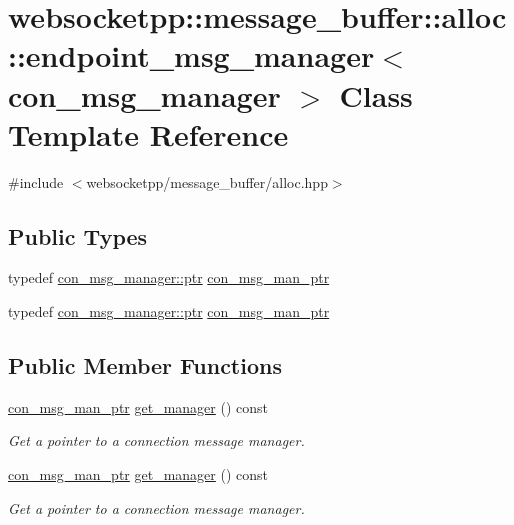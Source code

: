 \hypertarget{classwebsocketpp_1_1message__buffer_1_1alloc_1_1endpoint__msg__manager}{}\section{websocketpp\+:\+:message\+\_\+buffer\+:\+:alloc\+:\+:endpoint\+\_\+msg\+\_\+manager$<$ con\+\_\+msg\+\_\+manager $>$ Class Template Reference}
\label{classwebsocketpp_1_1message__buffer_1_1alloc_1_1endpoint__msg__manager}


{\ttfamily \#include $<$websocketpp/message\+\_\+buffer/alloc.\+hpp$>$}

\subsection*{Public Types}
\begin{DoxyCompactItemize}
\item 
typedef \hyperlink{classwebsocketpp_1_1message__buffer_1_1alloc_1_1con__msg__manager_ab4a21eb77cea439747f0b988e643e940}{con\+\_\+msg\+\_\+manager\+::ptr} \hyperlink{classwebsocketpp_1_1message__buffer_1_1alloc_1_1endpoint__msg__manager_aa850684cf613468b4c6bb1497dcb2f52}{con\+\_\+msg\+\_\+man\+\_\+ptr}
\item 
typedef \hyperlink{classwebsocketpp_1_1message__buffer_1_1alloc_1_1con__msg__manager_ab4a21eb77cea439747f0b988e643e940}{con\+\_\+msg\+\_\+manager\+::ptr} \hyperlink{classwebsocketpp_1_1message__buffer_1_1alloc_1_1endpoint__msg__manager_aa850684cf613468b4c6bb1497dcb2f52}{con\+\_\+msg\+\_\+man\+\_\+ptr}
\end{DoxyCompactItemize}
\subsection*{Public Member Functions}
\begin{DoxyCompactItemize}
\item 
\hyperlink{classwebsocketpp_1_1message__buffer_1_1alloc_1_1endpoint__msg__manager_aa850684cf613468b4c6bb1497dcb2f52}{con\+\_\+msg\+\_\+man\+\_\+ptr} \hyperlink{classwebsocketpp_1_1message__buffer_1_1alloc_1_1endpoint__msg__manager_a6652d0a87adff2a70770f7ef1d1d02c2}{get\+\_\+manager} () const 
\begin{DoxyCompactList}\small\item\em Get a pointer to a connection message manager. \end{DoxyCompactList}\item 
\hyperlink{classwebsocketpp_1_1message__buffer_1_1alloc_1_1endpoint__msg__manager_aa850684cf613468b4c6bb1497dcb2f52}{con\+\_\+msg\+\_\+man\+\_\+ptr} \hyperlink{classwebsocketpp_1_1message__buffer_1_1alloc_1_1endpoint__msg__manager_a6652d0a87adff2a70770f7ef1d1d02c2}{get\+\_\+manager} () const 
\begin{DoxyCompactList}\small\item\em Get a pointer to a connection message manager. \end{DoxyCompactList}\end{DoxyCompactItemize}


